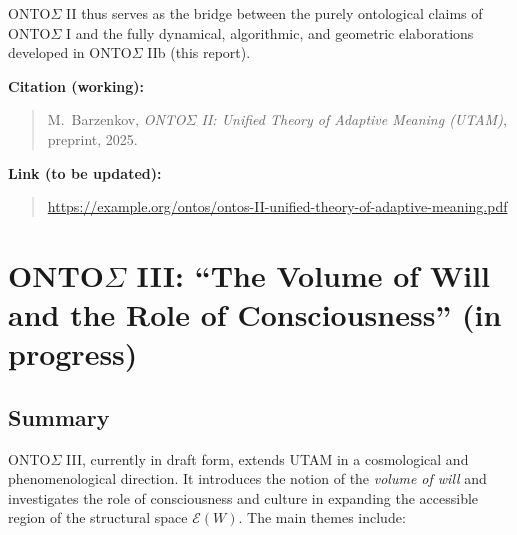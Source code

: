 \documentclass[12pt,a4paper]{report}
\newcommand{\Will}{W}
\begin{document}
ONTO$\Sigma$ II thus serves as the bridge between the purely ontological claims of ONTO$\Sigma$ I and the fully dynamical, algorithmic, and geometric elaborations developed in ONTO$\Sigma$ IIb (this report).

\noindent\textbf{Citation (working):}
\begin{quote}
M.\ Barzenkov, \emph{ONTO$\Sigma$ II: Unified Theory of Adaptive Meaning (UTAM)}, preprint, 2025.
\end{quote}

\noindent\textbf{Link (to be updated):}
\begin{quote}
\url{https://example.org/ontos/ontos-II-unified-theory-of-adaptive-meaning.pdf}
\end{quote}

\vspace{1em}

\section*{ONTO$\Sigma$ III: ``The Volume of Will and the Role of Consciousness'' (in progress)}

\subsection*{Summary}

ONTO$\Sigma$ III, currently in draft form, extends UTAM in a cosmological and phenomenological direction. It introduces the notion of the \emph{volume of will} and investigates the role of consciousness and culture in expanding the accessible region of the structural space \(\mathcal{E}(\Will)\). The main themes include:
\end{document}
